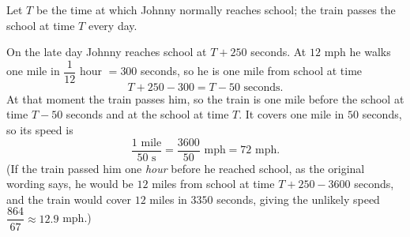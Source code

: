 Let $T$ be the time at which Johnny normally reaches school; the train passes the school at time $T$ every day.

On the late day Johnny reaches school at $T+250$ seconds. At $12$ mph he walks one mile in $\dfrac{1}{12}$ hour $=300$ seconds, so he is one mile from school at time
\[
T+250-300=T-50\text{ seconds}.
\]
At that moment the train passes him, so the train is one mile before the school at time $T-50$ seconds and at the school at time $T$. It covers one mile in $50$ seconds, so its speed is
\[
\dfrac{1\text{ mile}}{50\text{ s}}=\dfrac{3600}{50}\text{ mph}=\boxed{72\text{ mph}}.
\]
(If the train passed him one \emph{hour} before he reached school, as the original wording says, he would be $12$ miles from school at time $T+250-3600$ seconds, and the train would cover $12$ miles in $3350$ seconds, giving the unlikely speed $\dfrac{864}{67}\approx12.9$ mph.)
